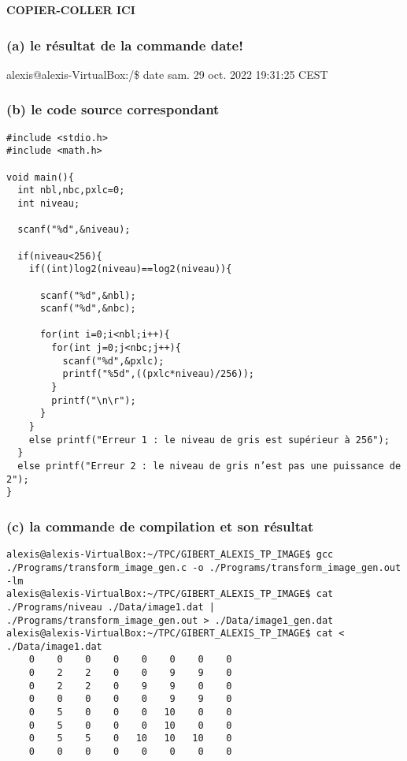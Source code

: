 \documentclass[11pt]{article}
\begin{document}
\textbf{COPIER-COLLER ICI}

\subsubsection{(a) le résultat de la commande
date!}\label{a-le-ruxe9sultat-de-la-commande-date}

alexis@alexis-VirtualBox:/\$ date sam. 29 oct. 2022 19:31:25 CEST

\subsubsection{(b) le code source
correspondant}\label{b-le-code-source-correspondant}

\begin{verbatim}
#include <stdio.h>
#include <math.h>

void main(){
  int nbl,nbc,pxlc=0;
  int niveau;
  
  scanf("%d",&niveau);
  
  if(niveau<256){
    if((int)log2(niveau)==log2(niveau)){
      
      scanf("%d",&nbl);
      scanf("%d",&nbc);
      
      for(int i=0;i<nbl;i++){
        for(int j=0;j<nbc;j++){
          scanf("%d",&pxlc);
          printf("%5d",((pxlc*niveau)/256));
        }
        printf("\n\r");
      }
    }
    else printf("Erreur 1 : le niveau de gris est supérieur à 256");
  }
  else printf("Erreur 2 : le niveau de gris n’est pas une puissance de 2");
}
\end{verbatim}

\subsubsection{(c) la commande de compilation et son
résultat}\label{c-la-commande-de-compilation-et-son-ruxe9sultat}

\begin{verbatim}
alexis@alexis-VirtualBox:~/TPC/GIBERT_ALEXIS_TP_IMAGE$ gcc ./Programs/transform_image_gen.c -o ./Programs/transform_image_gen.out -lm
alexis@alexis-VirtualBox:~/TPC/GIBERT_ALEXIS_TP_IMAGE$ cat ./Programs/niveau ./Data/image1.dat | ./Programs/transform_image_gen.out > ./Data/image1_gen.dat
alexis@alexis-VirtualBox:~/TPC/GIBERT_ALEXIS_TP_IMAGE$ cat < ./Data/image1.dat
    0    0    0    0    0    0    0    0
    0    2    2    0    0    9    9    0
    0    2    2    0    9    9    0    0
    0    0    0    0    0    9    9    0
    0    5    0    0    0   10    0    0
    0    5    0    0    0   10    0    0
    0    5    5    0   10   10   10    0
    0    0    0    0    0    0    0    0
\end{verbatim}
\end{document}
